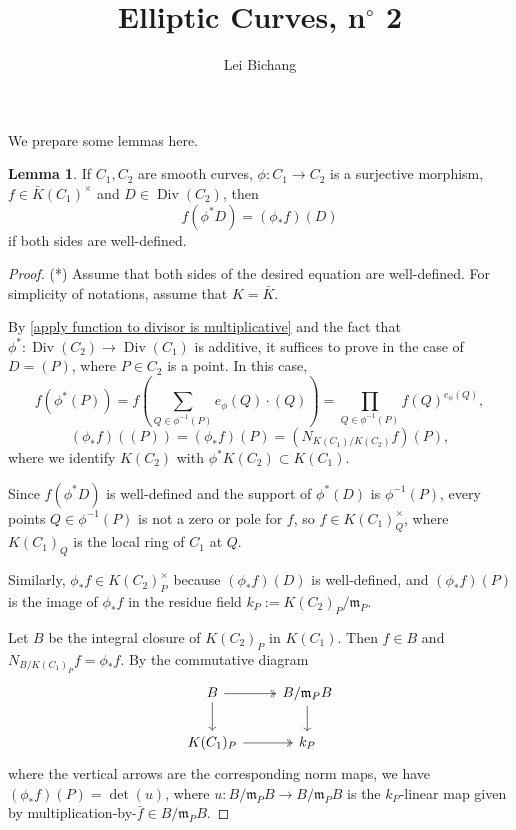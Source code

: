 \documentclass{article}
\title{Elliptic Curves, n$^\circ$ 2}
\author{Lei Bichang}
\theoremstyle{definition}
\newtheorem{lemma}{Lemma}
\theoremstyle{remark}
\DeclareMathOperator{\Div}{Div}
\newcommand{\m}{\mathfrak{m}}
\begin{document}
\maketitle

We prepare some lemmas here.
\begin{lemma}\label{compute norm}
    If $C_1, C_2$ are smooth curves, $\phi : C_1\to C_2$ is a surjective morphism, $f\in \bar{K}(C_1)^\times$ and $D\in\Div(C_2)$, then \[f(\phi^*D) = (\phi_*f)(D)\] if both sides are well-defined.
\end{lemma}
\begin{proof}(*)
    Assume that both sides of the desired equation are well-defined.
    For simplicity of notations, assume that $K = \bar{K}$.

    By \cref{apply function to divisor is multiplicative} and the fact that $\phi^* : \Div(C_2)\to\Div(C_1)$ is additive, it suffices to prove in the case of $D = (P)$, where $P\in C_2$ is a point.
    In this case, \[f(\phi^*(P)) = f\left(\sum_{Q\in\phi^{-1}(P)}e_\phi(Q)\cdot(Q)\right) = \prod_{Q\in\phi^{-1}(P)} f(Q)^{e_\phi(Q)},\]
    \[(\phi_*f)((P)) = (\phi_*f)(P) = (N_{K(C_1)/K(C_2)} f)(P),\]
    where we identify $K(C_2)$ with $\phi^*K(C_2)\subset K(C_1)$.

    Since $f(\phi^*D)$ is well-defined and the support of $\phi^*(D)$ is $\phi^{-1}(P)$, every points $Q\in\phi^{-1}(P)$ is not a zero or pole for $f$, so $f\in K(C_1)_{Q}^\times$, where $K(C_1)_{Q}$ is the local ring of $C_1$ at $Q$.

    Similarly, $\phi_*f\in K(C_2)_P^\times$ because $(\phi_*f)(D)$ is well-defined, and $(\phi_*f)(P)$ is the image of $\phi_*f$ in the residue field $k_P := K(C_2)_P/\mathfrak{m}_P$.

    Let $B$ be the integral closure of $K(C_2)_P$ in $K(C_1)$.
    Then $f\in B$ and $N_{B/K(C_1)_P}f = \phi_*f$.
    By the commutative diagram
\[\begin{tikzcd}
	B & {B/\mathfrak m_PB} \\
	{K(C_1)_P} & {k_P}
	\arrow[two heads, from=1-1, to=1-2]
	\arrow[from=1-1, to=2-1]
	\arrow[from=1-2, to=2-2]
	\arrow[two heads, from=2-1, to=2-2]
\end{tikzcd}\]where the vertical arrows are the corresponding norm maps,
    we have $(\phi_*f)(P) = \det(u)$, where $u : B/\m_PB\to B/\m_PB$ is the $k_P$-linear map given by multiplication-by-$\bar{f}\in B/\m_PB$.


\end{proof}
\end{document}
